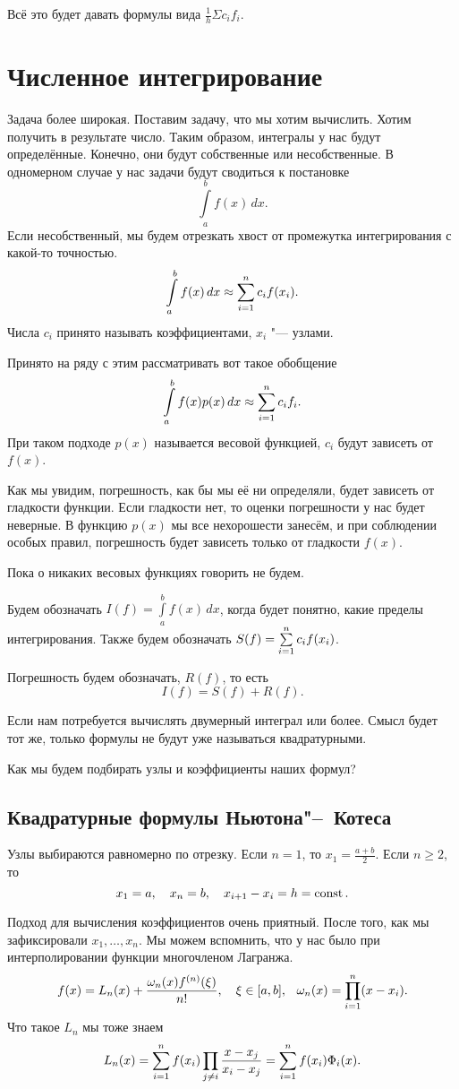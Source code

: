 Всё это будет давать формулы вида $\frac 1{h} \Sigma c_i f_i.$

\section{Численное интегрирование}
Задача более широкая. Поставим задачу, что мы хотим вычислить. Хотим получить в результате число. Таким образом, интегралы у нас будут определённые. Конечно, они будут собственные или несобственные. В одномерном случае у нас задачи будут сводиться к постановке
\[
  \int\limits_a^b f(x)\,dx.
\]
Если несобственный, мы будем отрезкать хвост от промежутка интегрирования с какой-то точностью.
\[
  \int\limits_a^b f(x)\,dx \approx \sum\limits_{i = 1}^{n} c_i f(x_i).
\]
Числа $c_i$ принято называть коэффициентами, $x_i$ "--- узлами.

Принято на ряду с этим рассматривать вот такое обобщение
\[
  \int\limits_a^b f(x) p(x)\,dx\approx \sum\limits_{i = 1}^{n} c_i f_i.
\]
При таком подходе $p(x)$ называется весовой функцией, $c_i$ будут зависеть от $f(x)$.

Как мы увидим, погрешность, как бы мы её ни определяли, будет зависеть от гладкости функции. Если гладкости нет, то оценки погрешности у нас будет неверные. В функцию $p(x)$ мы все нехорошести занесём, и при соблюдении особых правил, погрешность будет зависеть только от гладкости $f(x)$.

Пока о никаких весовых функциях говорить не будем.

Будем обозначать $I(f) = \int\limits_a^b f(x)\,dx$, когда будет понятно, какие пределы интегрирования. Также будем обозначать $S(f) = \sum\limits_{i = 1}^{n} c_i f(x_i)$.

Погрешность будем обозначать, $R(f)$, то есть
\[
  I(f) = S(f) + R(f).
\]

Если нам потребуется вычислять двумерный интеграл или более. Смысл будет тот же, только формулы не будут уже называться квадратурными.

Как мы будем подбирать узлы и коэффициенты наших формул?
\subsection{Квадратурные формулы Ньютона"--~Котеса}
Узлы выбираются равномерно по отрезку. Если $n=1$, то $x_1 = \frac{a+b}2$. Если $n\ge2$, то
\[
  x_1 = a,\quad x_n = b,\quad x_{i+1} - x_i = h = \operatorname{const}.
\]

Подход для вычисления коэффициентов очень приятный. После того, как мы зафиксировали $x_1,\dots,x_n$. Мы можем вспомнить, что у нас было при интерполировании функции многочленом Лагранжа.
\[
  f(x) = L_n(x) +\frac{\omega_n(x) f^{(n)}(\xi)}{n!},\quad
\xi\in[a,b],\hskip .75em plus.1em minus.08em\relax \omega_n(x) = \prod\limits_{i=1}^n (x-x_i).
\]
Что такое $L_n$ мы тоже знаем
\[
  L_n(x) = \sum\limits_{i = 1}^{n} f(x_i) \prod\limits_{j\ne i} \frac{x-x_j}{x_i-x_j} = 
  \sum\limits_{i = 1}^{n} f(x_i)\Phi_i(x).
\]

